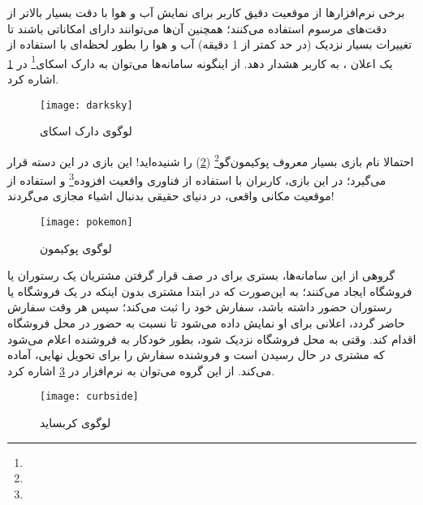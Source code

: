 
برخی نرم‌افزارها از موقعیت دقیق کاربر برای نمایش آب و هوا با دقت بسیار بالاتر از دقت‌های مرسوم استفاده می‌کنند؛ همچنین آن‌ها می‌توانند دارای امکاناتی باشند تا تغییرات بسیار نزدیک (در حد کمتر از 1 دقیقه) آب و هوا را بطور لحظه‌ای با استفاده از یک اعلان ، به کاربر هشدار دهد. از اینگونه سامانه‌ها می‌توان به دارک اسکای\footnote{}\cite{hist:4} در \cref{fig:darksky} اشاره کرد.

\begin{figure}[H]
	\centering
	\texttt{[image: darksky]}
	\caption{لوگوی دارک اسکای}
	\label{fig:darksky}
\end{figure}


احتمالا نام بازی بسیار معروف پوکیمون‌گو\footnote{}\cite{hist:5} (\cref{fig:pokemon}) را شنیده‌اید! این بازی در این دسته قرار می‌گیرد؛ در این بازی، کاربران با استفاده از فناوری واقعیت افزوده\footnote{} و استفاده از موقعیت مکانی واقعی، در دنیای حقیقی بدنبال اشیاء مجازی می‌گردند!

\begin{figure}[b]
	\centering
	\texttt{[image: pokemon]}
	\caption{لوگوی پوکیمون}
	\label{fig:pokemon}
\end{figure}


گروهی از این سامانه‌ها، بستری برای در صف قرار گرفتن مشتریان یک رستوران یا فروشگاه ایجاد می‌کنند؛ به این‌صورت که در ابتدا مشتری بدون اینکه در یک فروشگاه یا رستوران حضور داشته باشد، سفارش خود را ثبت می‌کند؛ سپس هر وقت سفارش حاضر گردد، اعلانی برای او نمایش داده می‌شود تا نسبت به حضور در محل فروشگاه اقدام کند. وقتی به محل فروشگاه نزدیک شود، بطور خودکار به فروشنده اعلام می‌شود که مشتری در حال رسیدن است و فروشنده سفارش را برای تحویل نهایی، آماده می‌کند. از این گروه می‌توان به نرم‌افزار \cite{hist:6} در \cref{fig:curbside} اشاره کرد.

\begin{figure}[H]
	\centering
	\texttt{[image: curbside]}
	\caption{لوگوی کربساید}
	\label{fig:curbside}
\end{figure}


